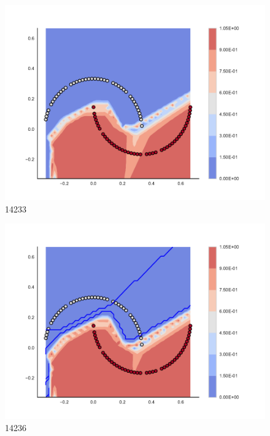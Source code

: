 \begin{subfigure}[b]{0.09\textwidth}
    \includegraphics[clip, trim=2.35cm 1.75cm 4.5cm 0cm,width=\textwidth]{img/convergence/14233.pdf}
    \caption{14233}
    \label{fig:convergence_14233}
\end{subfigure}
%
\begin{subfigure}[b]{0.09\textwidth}
    \includegraphics[clip, trim=2.35cm 1.75cm 4.5cm 0cm,width=\textwidth]{img/convergence/14236.pdf}
    \caption{14236}
    \label{fig:convergence_14236}
\end{subfigure}
%
